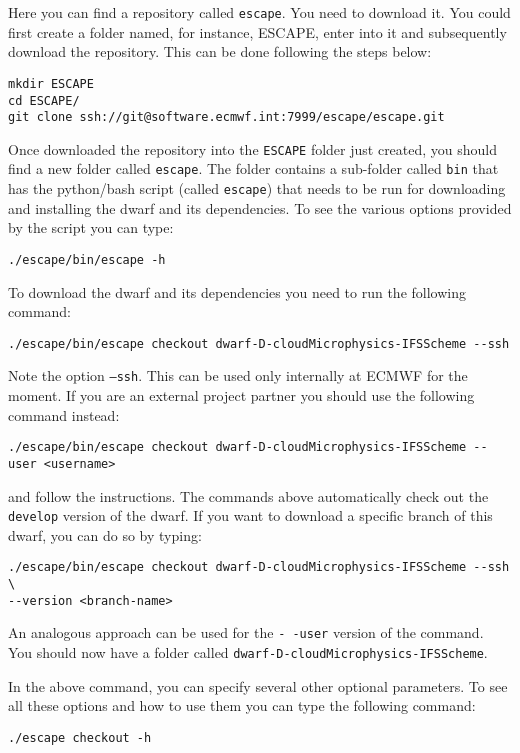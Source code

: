 \documentclass[
a4paper,     %
12pt,        %
article,
onecolumn,   %
openany,     %
]{memoir}
\newcommand{\inlsh}[1]{\texttt{#1}}
\newcommand{\inlsh}[1]{\tikz[anchor=base,baseline]\node[inner sep=2pt,
outer sep=0,draw=yellow!10,fill=yellow!10]{\texttt{#1}};}
\begin{document}
Here you can find a repository called \inlsh{escape}.
You need to download it. You could first create a 
folder named, for instance, ESCAPE, enter into it 
and subsequently download the repository. 
This can be done following the steps below:
%
\begin{lstlisting}[style=BashStyle]
mkdir ESCAPE
cd ESCAPE/
git clone ssh://git@software.ecmwf.int:7999/escape/escape.git
\end{lstlisting}
%
Once downloaded the repository into the \inlsh{ESCAPE} folder 
just created, you should find a new folder called \inlsh{escape}. 
The folder contains a sub-folder called \inlsh{bin} that has the 
python/bash script (called \inlsh{escape}) that needs to be 
run for downloading and installing the dwarf and its dependencies. 
To see the various options provided by the script you can type:
%
\begin{lstlisting}[style=BashStyle]
./escape/bin/escape -h
\end{lstlisting}
%
To download the dwarf and its dependencies you need to run 
the following command:
%
\begin{lstlisting}[style=BashStyle]
./escape/bin/escape checkout dwarf-D-cloudMicrophysics-IFSScheme --ssh
\end{lstlisting}
% 
Note the option \inlsh{--ssh}. This can be used only internally 
at ECMWF for the moment. If you are an external project partner
you should use the following command instead:
%
\begin{lstlisting}[style=BashStyle]
./escape/bin/escape checkout dwarf-D-cloudMicrophysics-IFSScheme --user <username>
\end{lstlisting}
% 
and follow the instructions. 
The commands above automatically check out the \inlsh{develop}
version of the dwarf. If you want to download a specific branch 
of this dwarf, you can do so by typing:
%
\begin{lstlisting}[style=BashStyle]
./escape/bin/escape checkout dwarf-D-cloudMicrophysics-IFSScheme --ssh \
--version <branch-name>
\end{lstlisting}
% 
An analogous approach can be used for the \inlsh{-\,-user} 
version of the command. You should now have a folder called 
\inlsh{dwarf-D-cloudMicrophysics-IFSScheme}.

In the above command, you can specify several other optional 
parameters. To see all these options and how to use them you 
can type the following command:
%
\begin{lstlisting}[style=BashStyle]
./escape checkout -h
\end{lstlisting}
%
\end{document}

